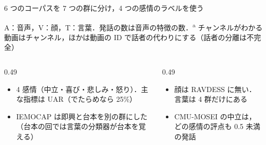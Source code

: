 \begin{frame}{6 つのコーパスを 7 つの群に分け，4 つの感情のラベルを使う}
  \vspace{0.1em}
  {\raggedright\tiny A：音声，V：顔，T：言葉．発話の数は音声の特徴の数．\textsuperscript{a} チャンネルがわかる動画はチャンネル，ほかは動画の ID で話者の代わりにする（話者の分離は不完全）\par}
  \vspace{0.2em}
  \begin{columns}[T,onlytextwidth]
    \begin{column}{0.49\textwidth}
      \begin{itemize}\scriptsize\setlength{\itemsep}{4pt}
        \item 4 感情（中立・喜び・悲しみ・怒り）．主な指標は UAR（でたらめなら 25\%）
        \item IEMOCAP は即興と台本を別の群にした（台本の回では言葉の分類器が台本を覚える）
      \end{itemize}
    \end{column}
    \begin{column}{0.49\textwidth}
      \begin{itemize}\scriptsize\setlength{\itemsep}{4pt}
        \item 顔は RAVDESS に無い．言葉は 4 群だけにある
        \item CMU-MOSEI の中立は，どの感情の評点も 0.5 未満の発話
      \end{itemize}
    \end{column}
  \end{columns}
\end{frame}

